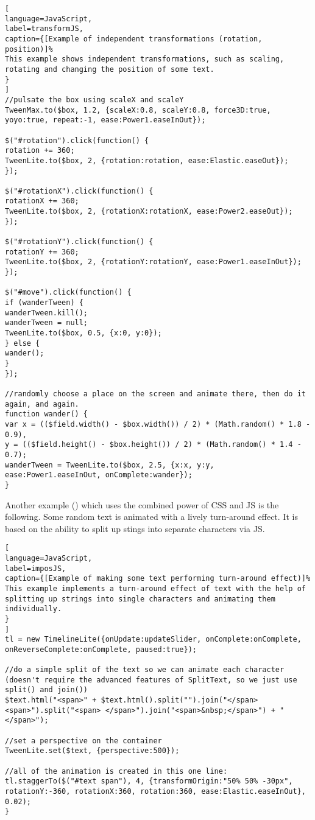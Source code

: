 \begin{lstlisting}[
language=JavaScript,
label=transformJS,
caption={[Example of independent transformations (rotation, position)]%
This example shows independent transformations, such as scaling, rotating and changing the position of some text.
}
]
//pulsate the box using scaleX and scaleY
TweenMax.to($box, 1.2, {scaleX:0.8, scaleY:0.8, force3D:true, yoyo:true, repeat:-1, ease:Power1.easeInOut});

$("#rotation").click(function() {
rotation += 360;
TweenLite.to($box, 2, {rotation:rotation, ease:Elastic.easeOut});
});

$("#rotationX").click(function() {
rotationX += 360;
TweenLite.to($box, 2, {rotationX:rotationX, ease:Power2.easeOut});
});

$("#rotationY").click(function() {
rotationY += 360;
TweenLite.to($box, 2, {rotationY:rotationY, ease:Power1.easeInOut});
});

$("#move").click(function() {
if (wanderTween) {
wanderTween.kill();
wanderTween = null;
TweenLite.to($box, 0.5, {x:0, y:0});
} else {
wander();
}
});

//randomly choose a place on the screen and animate there, then do it again, and again.
function wander() {
var x = (($field.width() - $box.width()) / 2) * (Math.random() * 1.8 - 0.9),
y = (($field.height() - $box.height()) / 2) * (Math.random() * 1.4 - 0.7);
wanderTween = TweenLite.to($box, 2.5, {x:x, y:y, ease:Power1.easeInOut, onComplete:wander});
}
\end{lstlisting}

\label{list:transformJS}


Another example (\citet{imposJS}) which uses the combined power of CSS and JS is the following. Some random text is animated with a lively turn-around effect. It is based on the ability to split up stings into separate characters via JS.


\begin{lstlisting}[
language=JavaScript,
label=imposJS,
caption={[Example of making some text performing turn-around effect)]%
This example implements a turn-around effect of text with the help of splitting up strings into single characters and animating them individually.
}
]
tl = new TimelineLite({onUpdate:updateSlider, onComplete:onComplete, onReverseComplete:onComplete, paused:true});

//do a simple split of the text so we can animate each character (doesn't require the advanced features of SplitText, so we just use split() and join())
$text.html("<span>" + $text.html().split("").join("</span><span>").split("<span> </span>").join("<span>&nbsp;</span>") + "</span>");

//set a perspective on the container
TweenLite.set($text, {perspective:500});

//all of the animation is created in this one line:
tl.staggerTo($("#text span"), 4, {transformOrigin:"50% 50% -30px", rotationY:-360, rotationX:360, rotation:360, ease:Elastic.easeInOut}, 0.02);
}
\end{lstlisting}

\label{list:imposJS}